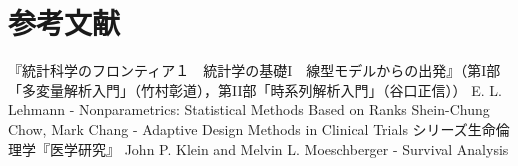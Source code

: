 \documentclass[uplatex,dvipdfmx]{jsreport}
\begin{document}
\chapter{参考文献}

\begin{thebibliography}{99}
    『統計科学のフロンティア１　統計学の基礎I　線型モデルからの出発』（第I部「多変量解析入門」（竹村彰道），第II部「時系列解析入門」（谷口正信））
    E. L. Lehmann - Nonparametrics: Statistical Methods Based on Ranks
    Shein-Chung Chow, Mark Chang - Adaptive Design Methods in Clinical Trials
    シリーズ生命倫理学『医学研究』
    John P. Klein and Melvin L. Moeschberger - Survival Analysis
\end{thebibliography}
\end{document}
